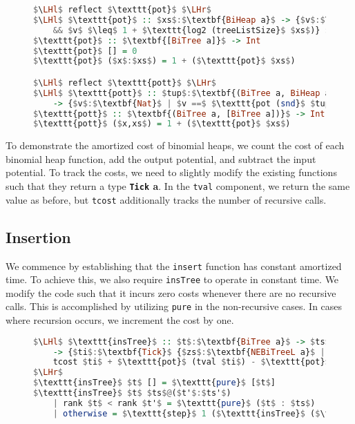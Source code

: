 \documentclass{clmthesis}
\begin{document}
\begin{figure}[h]
\begin{lstlisting}[mathescape=true, language=haskell, caption={Potential function binomial heap.},captionpos=b, label=fig:Bpotfun]
$\LHl$ reflect $\texttt{pot}$ $\LHr$
$\LHl$ $\texttt{pot}$ :: $xs$:$\textbf{BiHeap a}$ -> {$v$:$\textbf{Nat}$ | $v ==$ $\texttt{length}$ $xs$ 
	&& $v$ $\leq$ 1 + $\texttt{log2 (treeListSize}$ $xs$)} $\LHr$
$\texttt{pot}$ :: $\textbf{[BiTree a]}$ -> Int
$\texttt{pot}$ [] = 0
$\texttt{pot}$ ($x$:$xs$) = 1 + ($\texttt{pot}$ $xs$)

$\LHl$ reflect $\texttt{pott}$ $\LHr$
$\LHl$ $\texttt{pott}$ :: $tup$:$\textbf{(BiTree a, BiHeap a)}$ 
	-> {$v$:$\textbf{Nat}$ | $v ==$ $\texttt{pot (snd}$ $tup$)) + 1} $\LHr$
$\texttt{pott}$ :: $\textbf{(BiTree a, [BiTree a])}$ -> Int
$\texttt{pott}$ ($x,xs$) = 1 + ($\texttt{pot}$ $xs$)
\end{lstlisting}
\end{figure}
\FloatBarrier
To demonstrate the amortized cost of binomial heaps, we count the cost of each binomial heap function, add the output potential, and subtract the input potential.  To track the costs, we need to slightly modify the existing functions such that they return a type \textbf{\lstinline{Tick} a}. In the \lstinline{tval} component, we return the same value as before, but \lstinline{tcost} additionally tracks the number of recursive calls.

\subsection{Insertion}
We commence by establishing that the \texttt{insert} function has constant amortized time. To achieve this, we also require \texttt{insTree} to operate in constant time. We modify the code such that it incurs zero costs whenever there are no recursive calls. This is accomplished by utilizing \texttt{pure} in the non-recursive cases. In cases where recursion occurs, we increment the cost by one.

\begin{figure}[h]
\begin{lstlisting}[mathescape=true, language=haskell, caption={Amortized cost analysis of \texttt{insTree}.},captionpos=b, label=fig:insTpot]
$\LHl$ $\texttt{insTree}$ :: $t$:$\textbf{BiTree a}$ -> $ts$:$\textbf{BiHeap a}$  
	-> {$ti$:$\textbf{Tick}$ {$zs$:$\textbf{NEBiTreeL a}$ | ...} | $\texttt{ordRankH}$ (tval $ti$) && 
	tcost $ti$ + $\texttt{pot}$ (tval $ti$) - $\texttt{pot}$ $ts$ $\leq 1$}
$\LHr$
$\texttt{insTree}$ $t$ [] = $\texttt{pure}$ [$t$]
$\texttt{insTree}$ $t$ $ts$@($t'$:$ts'$)
	| rank $t$ < rank $t'$ = $\texttt{pure}$ ($t$ : $ts$)
	| otherwise = $\texttt{step}$ 1 ($\texttt{insTree}$ ($\texttt{link}$ $t$ $t'$) $ts'$)
\end{lstlisting}
\end{figure}
\end{document}
